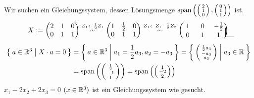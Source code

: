 \documentclass[../../main.tex]{subfiles}
\begin{document}
\begin{bsp}\label{dualex}
Wir suchen ein Gleichungssystem, dessen Lösungsmenge
$\operatorname{span}\left(\left(\begin{smallmatrix}2\\1\\0\end{smallmatrix}\right),\left(\begin{smallmatrix}0\\1\\1\end{smallmatrix}\right)\right)$ ist.
\begin{align*}
X:= \begin{pmatrix}
2 & 1 & 0\\
0 & 1 & 1
\end{pmatrix}\overset{Z_1 \leftarrow \frac{1}{2}Z_1}{\sim}\begin{pmatrix}
1 & \frac{1}{2} & 0\\
0 & 1 & 1
\end{pmatrix}\overset{Z_1\leftarrow Z_1-\frac{1}{2}Z_2}{\sim}\begin{pmatrix}
\tikz[baseline=(m1.base)]\node(m1){$1$}; & 0 & -\frac{1}{2}\\
0 & \tikz[baseline=(m2.base)]\node(m2){$1$}; & \tikz[baseline=(m3.base)]\node(m3){$1$};
\end{pmatrix}
\begin{tikzpicture}[overlay]
\draw (m1.north west) -- (m1.south west) -- (m2.north west) -- (m2.south west) -- (m3.south east);
\end{tikzpicture}
\end{align*}
\begin{align*}
\Set{a\in \mathbb R^3 | X\cdot a = 0} &= \Set{a\in\mathbb R^3 | a_1 = \frac{1}{2}a_3, a_2 = -a_3}= \Set{\left(\begin{smallmatrix}\frac{1}{2}a_3\\-a_3\\a_3\end{smallmatrix}\right)| a_3\in\mathbb R}\\
&= \operatorname{span}\left(\left(\begin{smallmatrix}\frac{1}{2}\\-1\\1\end{smallmatrix}\right)\right)= \operatorname{span}\left(\left(\begin{smallmatrix}1\\-2\\2\end{smallmatrix}\right)\right)
\end{align*}
$x_1-2x_2+2x_3 = 0$ $(x\in\mathbb R^3)$ ist ein Gleichungssystem wie gesucht.
\end{bsp}
\end{document}
